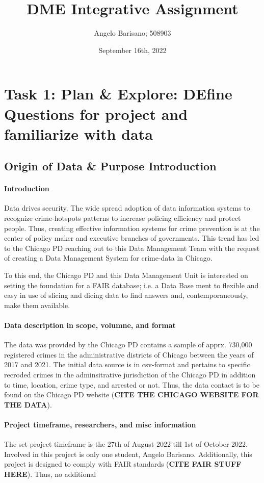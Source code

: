 \documentclass[a4paper]{article}
\begin{document}
\title{DME Integrative Assignment}
\author{Angelo Barisano; 508903 }
\date{September 16th, 2022}
\maketitle

\newpage
\section{Task 1: Plan \& Explore: DEfine Questions for project and familiarize with data}

\subsection{Origin of Data \& Purpose Introduction}
\paragraph{Introduction} Data drives security. The wide spread adoption of data information systems to recognize crime-hotspots patterns to increase policing efficiency and protect people. Thus, creating effective information systems for crime prevention is at the center of policy maker and executive branches of governments. This trend has led to the Chicago PD reaching out to this Data Management Team with the request of creating a Data Management System for crime-data in Chicago.

To this end, the Chicago PD and this Data Management Unit is interested on setting the foundation for a FAIR database; i.e. a Data Base ment to flexible and easy in use of slicing and dicing data to find answers and, contemporaneously, make them available. 

\paragraph{Data description in scope, volumne, and format}
The data was provided by the Chicago PD contains a sample of apprx. 730,000 registered crimes in the administrative districts of Chicago between the years of 2017 and 2021. The initial data source is in csv-format and pertains to specific recroded crimes in the adminsitrative jurisdiction of the Chicago PD in addition to time, location, crime type, and arrested or not. Thus, the data contact is to be found on the Chicago PD website (\textbf{CITE THE CHICAGO WEBSITE FOR THE DATA}).

\paragraph{Project timeframe, researchers, and misc information} The set project timeframe is the 27th of August 2022 till 1st of October 2022. Involved in this project is only one student, Angelo Barisano. Additionally, this project is designed to comply with FAIR standards (\textbf{CITE FAIR STUFF HERE}). Thus, no additional 
\end{document}
